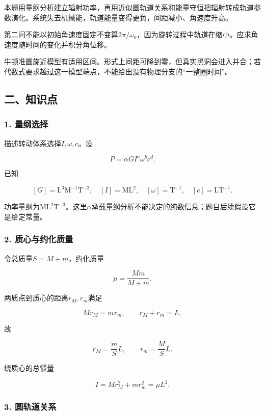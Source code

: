 \documentclass[12pt,a4paper,fontset=fandol]{ctexart}
\begin{document}
本题用量纲分析建立辐射功率，再用近似圆轨道关系和能量守恒把辐射转成轨道参数演化。系统失去机械能，轨道能量变得更负，间距减小、角速度升高。

第二问不能以初始角速度固定不变算\(2\pi/\omega_0\)，因为旋转过程中轨道在缩小。应求角速度随时间的变化并积分角位移。

牛顿准圆旋近模型有适用区间。形式上间距可降到零，但真实黑洞会进入并合；若代数式要求越过这一模型端点，不能给出没有物理分支的``一整圈时间''。

\subsection{二、知识点}\label{ux4e8cux77e5ux8bc6ux70b9-6}

\subsubsection{1. 量纲选择}\label{ux91cfux7eb2ux9009ux62e9}

描述转动体系选择\(I,\omega,c\)。设

\[
P=\alpha G I^a\omega^bc^d.
\]

已知

\[
[G]=\mathrm{L^3M^{-1}T^{-2}},
\quad [I]=\mathrm{ML^2},
\quad[\omega]=\mathrm{T^{-1}},
\quad[c]=\mathrm{LT^{-1}}.
\]

功率量纲为\(\mathrm{ML^2T^{-3}}\)。这里\(\alpha\)承载量纲分析不能决定的纯数信息；题目后续假设它是给定常量。

\subsubsection{2.
质心与约化质量}\label{ux8d28ux5fc3ux4e0eux7ea6ux5316ux8d28ux91cf}

令总质量\(S=M+m\)，约化质量

\[
\mu=\frac{Mm}{M+m}.
\]

两质点到质心的距离\(r_M,r_m\)满足

\[
Mr_M=mr_m,\qquad r_M+r_m=L,
\]

故

\[
r_M=\frac mS L,\qquad r_m=\frac MS L.
\]

绕质心的总惯量

\[
I=Mr_M^2+mr_m^2=\mu L^2.
\]

\subsubsection{3. 圆轨道关系}\label{ux5706ux8f68ux9053ux5173ux7cfb}
\end{document}

